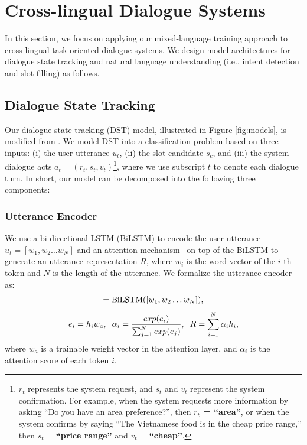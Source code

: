 \documentclass[letterpaper]{article} %
\newcommand{\citet}[1]{\citeauthor{#1} \shortcite{#1}}
\begin{document}
\section{Cross-lingual Dialogue Systems}
In this section, we focus on applying our mixed-language training approach to cross-lingual task-oriented dialogue systems. We design model architectures for dialogue state tracking and natural language understanding (i.e., intent detection and slot filling) as follows.

\subsection{Dialogue State Tracking}
Our dialogue state tracking (DST) model, illustrated in Figure \ref{fig:models}, is modified from \citet{chen2018xl}. We model DST into a classification problem based on three inputs: (i) the user utterance $ u_t $, (ii) the slot candidate $ s_c $, and (iii) the system dialogue acts $ a_t = (r_t, s_t, v_t) $\footnote{$r_t$ represents the system request, and $s_t$ and $v_t$ represent the system confirmation. For example, when the system requests more information by asking ``Do you have an area preference?'', then \textbf{$r_t$ = ``area''}, or when the system confirms by saying ``The Vietnamese food is in the cheap price range,'' then $s_t$ = \textbf{``price range''} and $v_t$ = \textbf{``cheap''}.}, where we use subscript $t$ to denote each dialogue turn. In short, our model can be decomposed into the following three components:

\subsubsection{Utterance Encoder}
We use a bi-directional LSTM (BiLSTM) to encode the user utterance $u_t=[w_1, w_2 \dots w_N]$ and an attention mechanism~\cite{felbo2017using} on top of the BiLSTM to generate an utterance representation $R$, where $w_i$ is the word vector of the $i$-th token and $N$ is the length of the utterance. We formalize the utterance encoder as:
\begin{equation}
    [h_1, h_2 \dots h_N] = \textnormal{BiLSTM}([w_1, w_2 \dots  w_N]),
\end{equation}
\begin{equation} \label{eq5}
    e_i = h_i w_a, \hspace{2mm} 
    \alpha_i = \frac{exp(e_i)}{\sum_{j=1}^N exp(e_j)}, \hspace{2mm} R = \sum_{i=1}^N \alpha_i h_i,
\end{equation}
where $w_a$ is a trainable weight vector in the attention layer, and $\alpha_i$ is the attention score of each token $i$.
\end{document}
